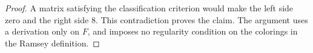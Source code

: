 \begin{proof}
A matrix satisfying the classification criterion would make the
left side zero and the right side $8$. This contradiction proves the
claim. The argument uses a derivation only on $F$, and imposes no
regularity condition on the colorings in the Ramsey definition.
\end{proof}
